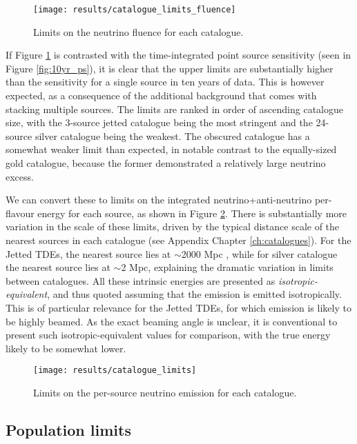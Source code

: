 \begin{figure}[!ht]
	\centering \texttt{[image: results/catalogue\_limits\_fluence]}
	\caption{Limits on the neutrino fluence for each catalogue.}
	\label{fig:cat_upper_limit_fluence}
\end{figure}

If Figure \ref{fig:cat_upper_limit_fluence} is contrasted with the time-integrated point source sensitivity (seen in Figure \ref{fig:10yr_ps}), it is clear that the upper limits are substantially higher than the sensitivity for a single source in ten years of data. This is however expected, as a consequence of the additional background that comes with stacking multiple sources. The limits are ranked in order of ascending catalogue size, with the 3-source jetted catalogue being the most stringent and the 24-source silver catalogue being the weakest. The obscured catalogue has a somewhat weaker limit than expected, in notable contrast to the equally-sized gold catalogue, because the former demonstrated a relatively large neutrino excess. 

We can convert these to limits on the integrated neutrino+anti-neutrino per-flavour energy for each source, as shown in Figure \ref{fig:cat_upper_limit}. There is substantially more variation in the scale of these limits, driven by the typical distance scale of the nearest sources in each catalogue (see Appendix Chapter \ref{ch:catalogues}). For the Jetted TDEs, the nearest source lies at $\sim$2000 Mpc , while for silver catalogue the nearest source lies at $\sim$2 Mpc, explaining the dramatic variation in limits between catalogues. All these intrinsic energies are presented as \emph{isotropic-equivalent}, and thus quoted assuming that the emission is emitted isotropically. This is of particular relevance for the Jetted TDEs, for which emission is likely to be highly beamed. As the exact beaming angle is unclear, it is conventional to present such isotropic-equivalent values for comparison, with the true energy likely to be somewhat lower. 

\begin{figure}[!ht]
	\centering \texttt{[image: results/catalogue\_limits]}
	\caption{Limits on the per-source neutrino emission for each catalogue.}
	\label{fig:cat_upper_limit}
\end{figure}

\subsection*{Population limits}

